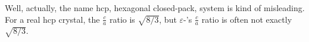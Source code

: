 
Well, actually, the name hcp, hexagonal closed-pack, system
is kind of misleading. For a real hcp crystal, the
$\tfrac{ c }{ a }$ ratio is $\sqrt{8/3}$, but $\varepsilon$-'s
$\tfrac{ c }{ a }$ ratio is often not exactly $\sqrt{8/3}$.